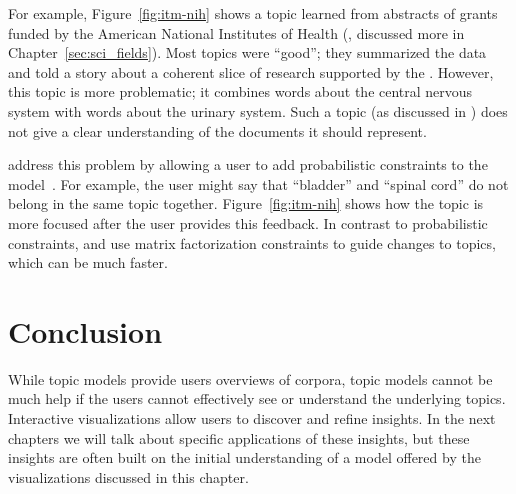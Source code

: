 For example, Figure~\ref{fig:itm-nih} shows a topic learned from abstracts of
grants funded by the American National Institutes of Health
(, discussed more in Chapter~\ref{sec:sci_fields}).  Most
topics were ``good''; they summarized the data and told a story about
a coherent slice of research supported by the .  However,
this topic is more problematic; it combines words about the central
nervous system with words about the urinary system.  Such a topic (as
discussed in \citet{mimno-11}) does not give a clear understanding of the
documents it should represent.


\citet{hu-14:itm} address this problem by allowing a user to add probabilistic
constraints to the model~\citep{boyd-graber-07,andrzejewski-09}.  For example,
the user might say that ``bladder'' and ``spinal cord'' do not belong in the same
topic together.  Figure~\ref{fig:itm-nih} shows how the topic is more focused after the
user provides this feedback.  In contrast to probabilistic constraints,
\citet{choo-13} and \citet{lund-17} use matrix factorization constraints to guide changes
to topics, which can be much faster.

\section{Conclusion}

While topic models provide users overviews of corpora, topic models
cannot be much help if the users cannot effectively see or understand
the underlying topics.
Interactive visualizations allow users to discover and
refine insights.  In the next chapters we will talk about specific applications of
these insights, but these insights are often built on the initial understanding
of a model offered by the visualizations discussed in this chapter.
